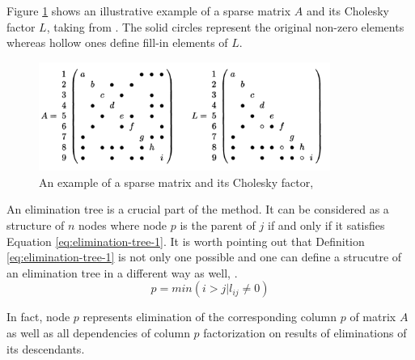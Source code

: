 
Figure \ref{fig:sparsity-pattern-example-mm} shows an illustrative example of a sparse matrix $A$ and its Cholesky factor $L$, taking from \cite{mult-frontal-original:2}. The solid circles represent the original non-zero elements whereas hollow ones define fill-in elements of $L$. \\

\begin{figure}[!htpb]
  \centering
  \includegraphics[width=0.85\textwidth]{figures/chapter-2/sparsity-pattern-example-mm.png}
\caption[An example of a sparse matrix and its Cholesky factor]{An example of a sparse matrix and its Cholesky factor, \cite{mult-frontal-original:2}}
\label{fig:sparsity-pattern-example-mm}
\end{figure}



An elimination tree is a crucial part of the method. It can be considered as a structure of $n$ nodes where node $p$ is the parent of $j$ if and only if it satisfies Equation \ref{eq:elimination-tree-1}. It is worth pointing out that Definition \ref{eq:elimination-tree-1} is not only one possible and one can define a strucutre of an elimination tree in a different way as well, \cite{mult-frontal-original:2}.\\%

\begin{equation} \label{eq:elimination-tree-1}
	p = min(i > j | l_{ij} \neq 0)
\end{equation}


In fact, node $p$ represents elimination of the corresponding column $p$ of matrix $A$ as well as all dependencies of column $p$ factorization on results of eliminations of its descendants.\\


